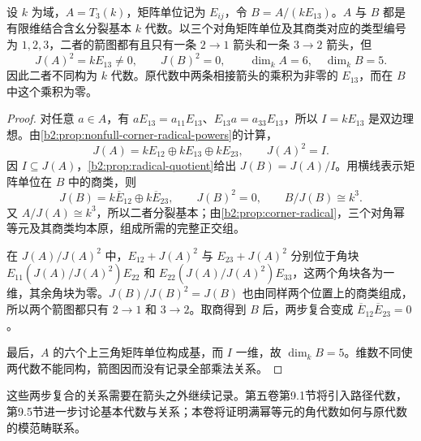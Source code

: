 \begin{proposition}\label{b2:prop:quiver-does-not-determine-algebra}
	设 \(k\) 为域，\(A=T_3(k)\)，矩阵单位记为 \(E_{ij}\)，令 \(B=A/(kE_{13})\)。\(A\) 与 \(B\) 都是有限维结合含幺分裂基本 \(k\) 代数。以三个对角矩阵单位及其商类对应的类型编号为 \(1,2,3\)，二者的箭图都有且只有一条 \(2\to1\) 箭头和一条 \(3\to2\) 箭头，但
	\[
		J(A)^2=kE_{13}\ne0,\qquad J(B)^2=0, \qquad \dim_kA=6,\quad\dim_kB=5.
	\]
	因此二者不同构为 \(k\) 代数。原代数中两条相接箭头的乘积为非零的 \(E_{13}\)，而在 \(B\) 中这个乘积为零。
\end{proposition}
\begin{proof}
	对任意 \(a\in A\)，有 \(aE_{13}=a_{11}E_{13}\)、\(E_{13}a=a_{33}E_{13}\)，所以 \(I=kE_{13}\) 是双边理想。由\cref{b2:prop:nonfull-corner-radical-powers}的计算，
	\[
		J(A)=kE_{12}\oplus kE_{13}\oplus kE_{23}, \qquad J(A)^2=I.
	\]
	因 \(I\subseteq J(A)\)，\cref{b2:prop:radical-quotient}给出 \(J(B)=J(A)/I\)。用横线表示矩阵单位在 \(B\) 中的商类，则
	\[
		J(B)=k\overline E_{12}\oplus k\overline E_{23}, \qquad J(B)^2=0,\qquad B/J(B)\cong k^3.
	\]
	又 \(A/J(A)\cong k^3\)，所以二者分裂基本；由\cref{b2:prop:corner-radical}，三个对角幂等元及其商类均本原，组成所需的完整正交组。

	在 \(J(A)/J(A)^2\) 中，\(E_{12}+J(A)^2\) 与 \(E_{23}+J(A)^2\) 分别位于角块 \(E_{11}(J(A)/J(A)^2)E_{22}\) 和 \(E_{22}(J(A)/J(A)^2)E_{33}\)，这两个角块各为一维，其余角块为零。\(J(B)/J(B)^2=J(B)\) 也由同样两个位置上的商类组成，所以两个箭图都只有 \(2\to1\) 和 \(3\to2\)。取商得到 \(B\) 后，两步复合变成 \(\overline E_{12}\overline E_{23}=0\)。

	最后，\(A\) 的六个上三角矩阵单位构成基，而 \(I\) 一维，故 \(\dim_kB=5\)。维数不同使两代数不能同构，箭图因而没有记录全部乘法关系。
\end{proof}

这些两步复合的关系需要在箭头之外继续记录。第五卷第9.1节将引入路径代数，第9.5节进一步讨论基本代数与关系；本卷将证明满幂等元的角代数如何与原代数的模范畴联系。
